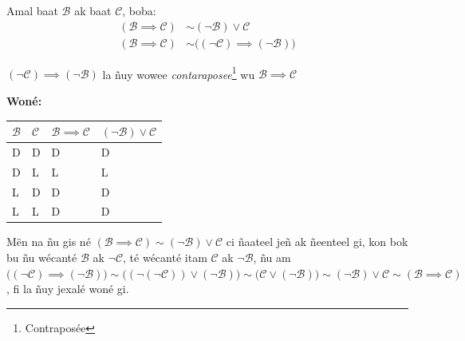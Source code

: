 \documentclass[twoside, a4paper]{article}
\begin{document}
\begin{tcolorbox}[enhanced jigsaw,breakable,pad at break*=1mm, colback=blue!5!white,colframe=white!75!black,title= Tèg\footnote{Proposition},
    watermark color=white]
  Amal baat $\mathcal{B}$ ak baat $\mathcal{C}$, boba:
  \begin{align*}
    (\mathcal{B} \implies \mathcal{C}) & \sim (\neg\mathcal{B}) \lor \mathcal{C}                        \\
    (\mathcal{B} \implies \mathcal{C}) & \sim \big( (\neg\mathcal{C}) \implies (\neg \mathcal{B}) \big)
  \end{align*}

  $(\neg\mathcal{C}) \implies (\neg \mathcal{B})$ la ñuy wowee \textit{contaraposee}\footnote{Contraposée} wu $\mathcal{B} \implies \mathcal{C}$
\end{tcolorbox}

\textbf{Woné:}

\begin{tabularx}{0.8\textwidth} {
    | >{\centering\arraybackslash}X
    | >{\centering\arraybackslash}X
    | >{\centering\arraybackslash}X
    | >{\centering\arraybackslash}X |}
  \hline
  $\mathcal{B}$ & $\mathcal{C}$ & $\mathcal{B}\implies\mathcal{C}$ & $(\neg\mathcal{B}) \lor \mathcal{C}$ \\
  \hline
  D             & D             & D                                & D                                    \\
  D             & L             & L                                & L                                    \\
  L             & D             & D                                & D                                    \\
  L             & L             & D                                & D                                    \\
  \hline
\end{tabularx}
\vskip 0.5cm
Mën na ñu gis né $(\mathcal{B} \implies \mathcal{C}) \sim (\neg\mathcal{B}) \lor \mathcal{C}$ ci ñaateel jeñ ak ñeenteel gi, kon bok bu ñu wécanté $\mathcal{B}$ ak $\neg \mathcal{C}$, té wécanté itam $\mathcal{C}$ ak $\neg\mathcal{B}$, ñu am $\big( (\neg\mathcal{C}) \implies (\neg \mathcal{B}) \big) \sim \big( (\neg(\neg\mathcal{C})) \lor (\neg\mathcal{B})\big) \sim \big(\mathcal{C} \lor (\neg\mathcal{B}) \big)\sim (\neg\mathcal{B}) \lor \mathcal{C} \sim (\mathcal{B} \implies \mathcal{C})$, fi la ñuy jexalé woné gi.\\
\end{document}
